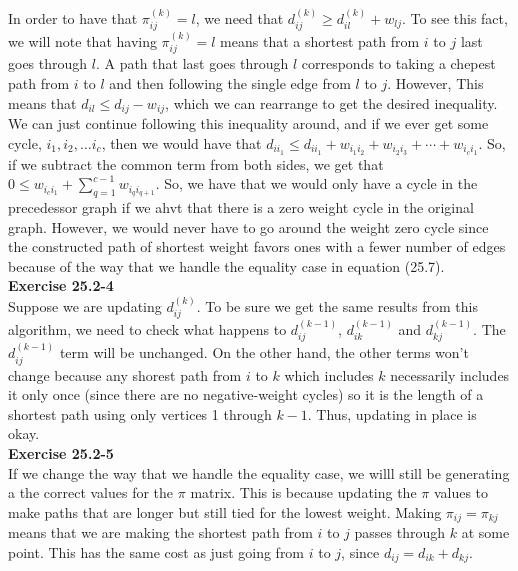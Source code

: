 \documentclass{article}
\begin{document}
In order to have that $\pi_{ij}^{(k)} = l$, we need that $d_{ij}^{(k)} \ge d_{il}^{(k)} + w_{lj}$. To see this fact, we will note that having $\pi_{ij}^{(k)} = l$ means that a shortest path from $i$ to $j$ last goes through $l$. A path that last goes through $l$ corresponds to taking a chepest path from $i$ to $l$ and then following the single edge from $l$ to $j$. However, This means that $d_{il} \le d_{ij} - w_{ij}$, which we can rearrange to get the desired inequality. We can just continue following this inequality around, and if we ever get some cycle, $i_1,i_2,\ldots i_c$, then we would have that $d_{i i_1} \le d_{i i_1} + w_{i_1 i_2} + w_{i_2 i_3} + \cdots + w_{i_c i_1}$. So, if we subtract the common term from both sides, we get that $0 \le w_{i_c i_1}+ \sum_{q =1}^{c-1} w_{i_q i_{q+1}}$. So, we have that we would only have a cycle in the precedessor graph if we ahvt that there is a zero weight cycle in the original graph. However, we would never have to go around the weight zero cycle since the constructed path of shortest weight favors ones with a fewer number of edges because of the way that we handle the equality case in equation (25.7).\\

\noindent\textbf{Exercise 25.2-4}\\

Suppose we are updating $d_{ij}^(k)$. To be sure we get the same results from this algorithm, we need to check what happens to $d_{ij}^{(k-1)}$, $d_{ik}^{(k-1)}$ and $d_{kj}^{(k-1)}$.  The $d_{ij}^{(k-1)}$ term will be unchanged.  On the other hand, the other terms won't change because any shorest path from $i$ to $k$ which includes $k$ necessarily includes it only once (since there are no negative-weight cycles) so it is the length of a shortest path using only vertices 1 through $k-1$.  Thus, updating in place is okay. \\

\noindent\textbf{Exercise 25.2-5}\\

If we change the way that we handle the equality case, we willl still be generating a the correct values for the $\pi$ matrix. This is because updating the $\pi$ values to make paths that are longer but still tied for the lowest weight. Making $\pi_{ij} = \pi_{kj}$ means that we are making the shortest path from $i$ to $j$ passes through $k$ at some point. This has the same cost as just going from $i$ to $j$, since $d_{ij} = d_{ik}+d_{kj}$.\\
\end{document}
